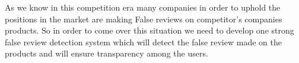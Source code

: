 \documentclass[12pt,a4paper]{report}
\begin{document}
As we know in this competition era many companies in order to uphold the positions in the market are making False reviews on competitor's companies products. So in order to come over this situation we need to develop one strong false review detection system which will detect the false review made on the products and will ensure transparency among the users.



\end{document}
